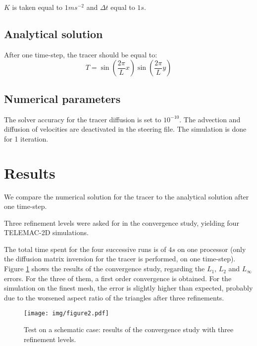 $K$ is taken equal to $1 m s^{-2}$ and $\Delta t$ equal to $1s$.

\subsection{Analytical solution}

After one time-step, the tracer should be equal to:
\begin{equation}
T = \sin \left(\dfrac{2 \pi}{L}x \right) \sin \left( \dfrac{2 \pi}{L}y\right)
\end{equation}

\subsection{Numerical parameters}
The solver accuracy for the tracer diffusion is set to $10^{-10}$.
The advection and diffusion of velocities are deactivated in the steering file.
The simulation is done for 1 iteration.


\section{Results}
We compare the numerical solution for the tracer 
to the analytical solution after one time-step.

Three refinement levels were asked for in the convergence study, yielding
four TELEMAC-2D simulations. 

The total time spent for the four successive runs is of $4s$ on one processor 
(only the diffusion matrix inversion for the tracer is performed, on one time-step).
Figure \ref{fig:figure2} shows the results of the convergence study, regarding
the $L_1$, $L_2$ and $L_{\infty}$ errors. For the three of them, a first order
convergence is obtained. For the simulation on the finest mesh, the error
is slightly higher than expected, probably due to the worsened aspect ratio
of the triangles after three refinements. 
\begin{figure}
  \begin{center}
    \texttt{[image: img/figure2.pdf]}
    \caption{Test on a schematic case: results of the convergence study
      with three refinement levels.}
    \label{fig:figure2}
  \end{center}
\end{figure}
